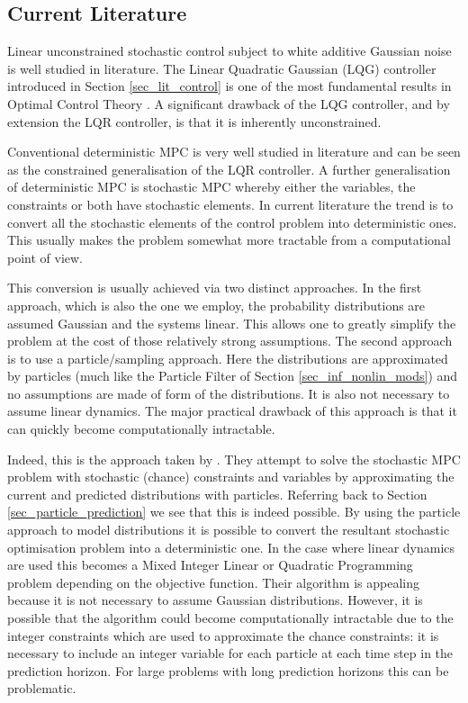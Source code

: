 \subsection{Current Literature}
Linear unconstrained stochastic control subject to white additive Gaussian noise is well studied in literature. The Linear Quadratic Gaussian (LQG) controller introduced in Section \ref{sec_lit_control} is one of the most fundamental results in Optimal Control Theory \cite{lqg}. A significant drawback of the LQG controller, and by extension the LQR controller, is that it is inherently unconstrained.

Conventional deterministic MPC is very well studied in literature \cite{raw} and can be seen as the constrained generalisation of the LQR controller. A further generalisation of deterministic MPC is stochastic MPC whereby either the variables, the constraints or both have stochastic elements. In current literature the trend is to convert all the stochastic elements of the control problem into deterministic ones. This usually makes the problem somewhat more tractable from a computational point of view.

This conversion is usually achieved via two distinct approaches. In the first approach, which is also the one we employ, the probability distributions are assumed Gaussian and the systems linear. This allows one to greatly simplify the problem at the cost of those relatively strong assumptions. The second approach is to use a particle/sampling approach. Here the distributions are approximated by particles (much like the Particle Filter of Section \ref{sec_inf_nonlin_mods}) and no assumptions are made of form of the distributions. It is also not necessary to assume linear dynamics. The major practical drawback of this approach is that it can quickly become computationally intractable.

Indeed, this is the approach taken by \cite{blackmore}. They attempt to solve the stochastic MPC problem with stochastic (chance) constraints and variables by approximating the current and predicted distributions with particles. Referring back to Section \ref{sec_particle_prediction} we see that this is indeed possible. By using the particle approach to model distributions it is possible to convert the resultant stochastic optimisation problem into a deterministic one. In the case where linear dynamics are used this becomes a Mixed Integer Linear or Quadratic Programming problem depending on the objective function. Their algorithm is appealing because it is not necessary to assume Gaussian distributions. However, it is possible that the algorithm could become computationally intractable due to the integer constraints which are used to approximate the chance constraints: it is necessary to include an integer variable for each particle at each time step in the prediction horizon. For large problems with long prediction horizons this can be problematic. 

